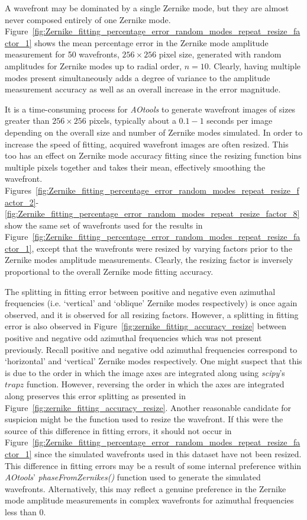 A wavefront may be dominated by a single Zernike mode, but they are almost 
never composed entirely of one Zernike mode. 
Figure~\ref{fig:Zernike_fitting_percentage_error_random_modes_repeat_resize_factor_1} shows the mean percentage error in the Zernike mode amplitude 
measurement for 50 wavefronts, $256\times256$ pixel size, generated with 
random amplitudes for Zernike modes up to radial order, $n = 10$. Clearly, 
having multiple modes present simultaneously adds a degree of variance to the 
amplitude measurement accuracy as well as an overall increase in the error 
magnitude.

It is a time-consuming process for \textit{AOtools} to generate wavefront 
images of sizes greater than $256\times256$ pixels, typically about a $0.1-1$ 
seconds per image depending on the overall size and number of Zernike modes 
simulated. In order to increase the speed of fitting, acquired wavefront 
images are often resized. This too has an effect on Zernike mode accuracy 
fitting since the resizing function bins multiple pixels together and takes 
their mean, effectively smoothing the wavefront. 
Figures~\ref{fig:Zernike_fitting_percentage_error_random_modes_repeat_resize_factor_2}-\ref{fig:Zernike_fitting_percentage_error_random_modes_repeat_resize_factor_8} show the same set of wavefronts used for the results in 
Figure~\ref{fig:Zernike_fitting_percentage_error_random_modes_repeat_resize_factor_1}, except that the wavefronts were resized by varying factors prior to 
the Zernike modes amplitude measurements. Clearly, the resizing factor is 
inversely proportional to the overall Zernike mode fitting accuracy.

The splitting in fitting error between positive and negative even azimuthal 
frequencies (i.e. `vertical' and `oblique' Zernike modes respectively) is 
once again observed, and it is observed for all resizing factors. However, a 
splitting in fitting error is also observed in 
Figure~\ref{fig:zernike_fitting_accuracy_resize} between positive and 
negative odd azimuthal frequencies which was not present previously. Recall 
positive and negative odd azimuthal frequencies correspond to `horizontal' 
and `vertical' Zernike modes respectively. One might suspect that this is due 
to the order in which the image axes are integrated along using 
\textit{scipy}'s $trapz$ function. However, reversing the order in which the 
axes are integrated along preserves this error splitting as presented in 
Figure~\ref{fig:zernike_fitting_accuracy_resize}. Another reasonable 
candidate for suspicion might be the function used to resize the wavefront. 
If this were the source of this difference in fitting errors, it should not 
occur in 
Figure~\ref{fig:Zernike_fitting_percentage_error_random_modes_repeat_resize_factor_1} since the simulated wavefronts used in this dataset have not been 
resized. This difference in fitting errors may be a result of some internal 
preference within \textit{AOtools}' \textit{phaseFromZernikes()} function 
used to generate the simulated wavefronts. Alternatively, this may reflect a 
genuine preference in the Zernike mode amplitude measurements in complex 
wavefronts for azimuthal frequencies less than 0.


